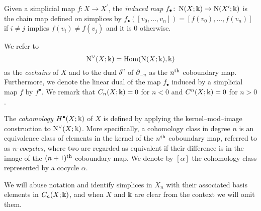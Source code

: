 Given a simplicial map $f \colon X \to X^\prime$, the \textit{induced map} $f_\bullet \colon \operatorname{N}(X; \Bbbk) \to \operatorname{N}(X^\prime; \Bbbk)$ is the chain map defined on simplices by $f_\bullet([v_0, \dots, v_n]) = [f(v_0), \dots, f(v_n)]$ if $i \neq j$ implies $ f(v_i) \neq f(v_j)$ and it is $0$ otherwise.

We refer to
\begin{equation*}
\operatorname{N^{\vee}}(X; \Bbbk) = \mathrm{Hom}(\operatorname{N}(X; \Bbbk), \Bbbk)
\end{equation*}
as the \textit{cochains} of $X$ and to the dual $\delta^{n}$ of $\partial_{-n}$ as the $n^{\mathrm{th}}$ coboundary map.
Furthermore, we denote the linear dual of the map $f_\bullet$ induced by a simplicial map $f$ by $f^\bullet$.
We remark that $C_n(X; \Bbbk) = 0$ for $n < 0$ and $C^n(X;\Bbbk) = 0$ for $n > 0$.

The \textit{cohomology} $H^\bullet(X; \Bbbk)$ of $X$ is defined by applying the kernel--mod--image construction to $\operatorname{N^{\vee}}(X; \Bbbk)$.
More specifically, a cohomology class in degree $n$ is an equivalence class of elements in the kernel of the $n^{\mathrm{th}}$ coboundary map, referred to as $n$-\textit{cocycles}, where two are regarded as equivalent if their difference is in the image of the $(n+1)^{\mathrm{th}}$ coboundary map.
We denote by $[\alpha]$ the cohomology class represented by a cocycle $\alpha$.

We will abuse notation and identify simplices in $X_n$ with their associated basis elements in $C_{n}(X; \Bbbk)$, and when $X$ and $\Bbbk$ are clear from the context we will omit them.